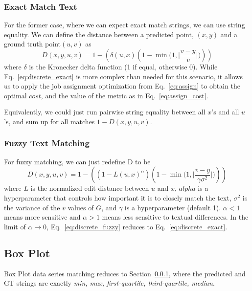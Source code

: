 \documentclass[a4paper,11pt]{scrartcl}
\begin{document}
\subsubsection{Exact Match Text}
\label{sec:discrete_exact}

For the former case, where we can expect exact match strings, we can use string equality.
We can define the distance between a predicted point, $(x, y)$ and a ground truth point$(u, v)$ as
\begin{equation} \label{eq:discrete_exact}
D(x,y,u,v) = 1 - (\delta(u, x) (1 - \min \Big(1, \Big| \frac{v - y}{v} \Big| \Big)))
\end{equation}
where $\delta$ is the Kronecker delta function (1 if equal, otherwise 0).
While Eq.~\ref{eq:discrete_exact} is more complex than needed for this scenario, it allows us to apply the job assignment optimization from Eq.~\ref{eq:assign} to obtain the optimal $cost$, and the value of the metric as in Eq.~\ref{eq:assign_cost}.

Equivalently, we could just run pairwise string equality between all $x$'s and all $u$'s, and sum up for all matches $1 - D(x,y,u,v)$.

\subsubsection{Fuzzy Text Matching}

For fuzzy matching, we can just redefine D to be
\begin{equation} \label{eq:discrete_fuzzy}
D(x,y,u,v) = 1 - ((1 - L(u, x)^\alpha) (1 - \min \Big(1, \Big| \frac{v - y}{\gamma\sigma^2} \Big| \Big)))
\end{equation}
where $L$ is the normalized edit distance between $u$ and $x$, $alpha$ is a hyperparameter that controls how important it is to closely match the text, $\sigma^2$ is the variance of the $v$ values of $G$, and $\gamma$ is a hyperparameter (default 1).
$\alpha < 1$ means more sensitive and $\alpha > 1$ means less sensitive to textual differences.
In the limit of  $\alpha \rightarrow 0$, Eq.~\ref{eq:discrete_fuzzy} reduces to Eq.~\ref{eq:discrete_exact}.

\subsection{Box Plot}

Box Plot data series matching reduces to Section~\ref{sec:discrete_exact}, where the predicted and GT strings are exactly \emph{min, max, first-quartile, third-quartile, median}.
\end{document}
